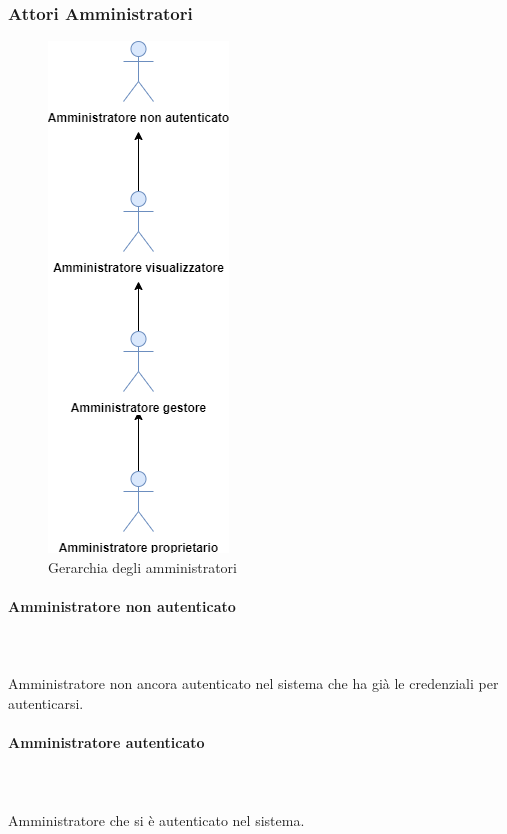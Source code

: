 \subsubsection{Attori Amministratori}
\begin{figure}[h]
  \caption{Gerarchia degli amministratori}
  \centering
    \includegraphics[scale=0.6]{Sezioni/UseCase/Immagini/Amministratori.png}
\end{figure}


\paragraph{Amministratore non autenticato}\mbox{}\\ \\
Amministratore non ancora autenticato nel sistema che ha già le credenziali per autenticarsi.
\paragraph{Amministratore autenticato}\mbox{}\\ \\
Amministratore che si è autenticato nel sistema.
